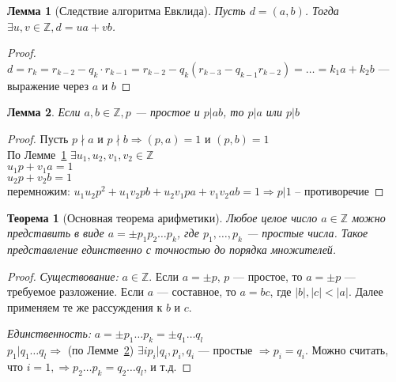 \documentclass{article}
\theoremstyle{definition}
\theoremstyle{plain}
\newtheorem{theorem}{Теорема}
\newtheorem{lemma}{Лемма}
\begin{document}
\begin{lemma}[Следствие алгоритма Евклида]\label{lemma:1}
  Пусть $d = (a, b)$.
  Тогда $\exists u, v \in \mathbb{Z}, d = ua + vb$.
\end{lemma}
\begin{proof}
  $d = r_{k} = r_{k - 2} - q_{k} \cdot r_{k - 1} = r_{k - 2} - q_{k}(r_{k - 3} - q_{k - 1}r_{k - 2}) = \ldots = k_{1}a + k_{2}b$ --- выражение через $a$ и $b$
\end{proof}

\begin{lemma}\label{lemma:2}
  Если $a, b \in \mathbb{Z}, p$ --- простое и $p | ab$, то $p|a$ или $p|b$
\end{lemma}
\begin{proof}
  Пусть $p \nmid a$ и $p \nmid b \Rightarrow (p, a) = 1$ и $(p, b) = 1$\\
  По Лемме~\ref{lemma:1} $\exists u_{1},u_{2},v_{1}, v_{2} \in \mathbb{Z}$\\
  $u_{1}p+v_{1}a = 1$\\
  $u_{2}p+v_{2}b = 1$ \\
  перемножим: $u_{1}u_{2}p^{2} + u_{1}v_{2}pb + u_{2}v_{1}pa + v_{1}v_{2}ab = 1 \Rightarrow p|1$ -- противоречие
\end{proof}

\begin{theorem}[Основная теорема арифметики]
  Любое целое число $a \in \mathbb{Z}$ можно представить в виде $a = \pm p_{1}p_{2}\ldots p_{k}$, где $p_{1}, \ldots, p_{k}$ --- простые числа.
  Такое представление единственно с точностью до порядка множителей.
\end{theorem}
\begin{proof}
  \emph{Существование:}
  $a \in \mathbb{Z}$. Если $a = \pm p$, $p$ --- простое, то $a = \pm p$ --- требуемое разложение.
  Если $a$ --- составное, то $a = bc$, где $|b|, |c| < |a|$.
  Далее применяем те же рассуждения к $b$ и $c$.

  \emph{Единственность:}
  $a = \pm p_{1} \ldots p_{k} = \pm q_{1} \ldots q_{l}$\\
  $p_{1}|q_{1} \ldots q_{l} \Rightarrow$ (по Лемме~\ref{lemma:2}) $\exists i p_{i}|q_{i}, p_{i},q_{i}$ --- простые $\Rightarrow p_{i} = q_{i}$.
  Можно считать, что $i = 1, \Rightarrow p_{2} \ldots p_{k} = q_{2} \ldots q_{l}$, и т.д.
\end{proof}
\end{document}
